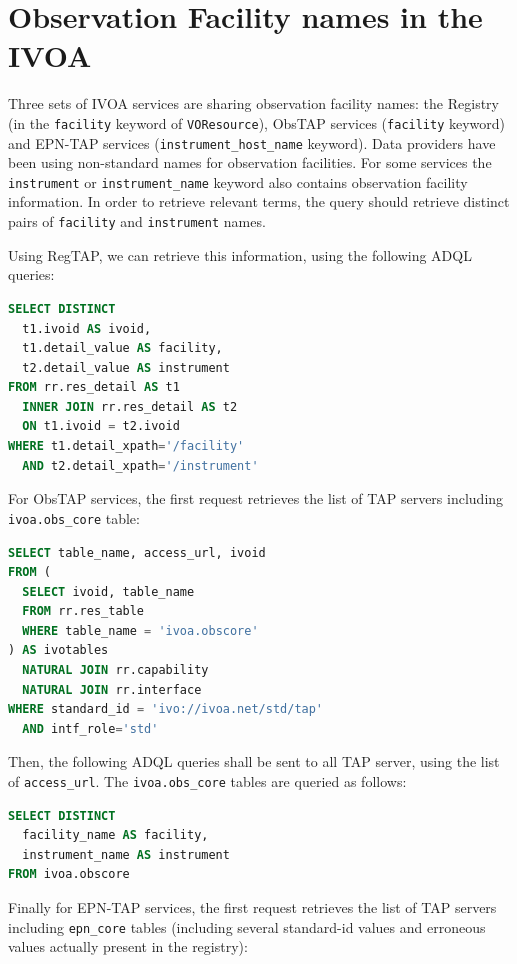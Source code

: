 \documentclass[11pt,a4paper]{ivoa}
\begin{document}
\section{Observation Facility names in the IVOA}

Three sets of IVOA services are sharing observation facility names: 
the Registry (in the \texttt{facility} keyword of \texttt{VOResource}), 
ObsTAP services (\texttt{facility} keyword) and EPN-TAP services 
(\texttt{instrument\_host\_name} keyword). Data providers have been 
using non-standard names for observation facilities. For some services 
the \texttt{instrument} or \texttt{instrument\_name} keyword also contains 
observation facility information. In order to retrieve relevant terms, the 
query should retrieve distinct pairs of  \texttt{facility}  and  
\texttt{instrument} names.

Using RegTAP, we can retrieve this information, using the following ADQL queries:

\begin{lstlisting}[language=SQL]
SELECT DISTINCT 
  t1.ivoid AS ivoid, 
  t1.detail_value AS facility, 
  t2.detail_value AS instrument 
FROM rr.res_detail AS t1 
  INNER JOIN rr.res_detail AS t2 
  ON t1.ivoid = t2.ivoid 
WHERE t1.detail_xpath='/facility' 
  AND t2.detail_xpath='/instrument'
\end{lstlisting}

For ObsTAP services, the first request retrieves the list of TAP
servers including \texttt{ivoa.obs\_core} table:

\begin{lstlisting}[language=SQL]
SELECT table_name, access_url, ivoid 
FROM ( 
  SELECT ivoid, table_name 
  FROM rr.res_table 
  WHERE table_name = 'ivoa.obscore'
) AS ivotables
  NATURAL JOIN rr.capability
  NATURAL JOIN rr.interface 
WHERE standard_id = 'ivo://ivoa.net/std/tap' 
  AND intf_role='std'
\end{lstlisting}

Then, the following ADQL queries shall be sent to all TAP server, 
using the list of \texttt{access\_url}. The \texttt{ivoa.obs\_core} 
tables are queried as follows: 

\begin{lstlisting}[language=SQL]
SELECT DISTINCT 
  facility_name AS facility, 
  instrument_name AS instrument 
FROM ivoa.obscore
\end{lstlisting}

Finally for EPN-TAP services, the first request retrieves the list of TAP
servers including \texttt{epn\_core} tables (including several standard-id 
values and erroneous values actually present in the registry): 
\end{document}
